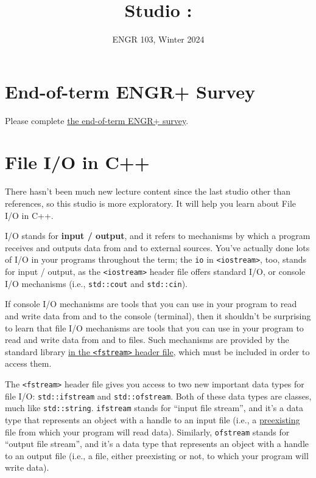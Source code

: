 \documentclass{article}
\title{
    Studio \studionumber: \studiotitle
}
\author{ENGR 103, Winter 2024}
\date{}
\begin{document}
\maketitle

\section{End-of-term ENGR+ Survey}

Please complete \href{https://oregonstate.qualtrics.com/jfe/form/SV_8v8s4iCbF3sr0Fw}{the end-of-term ENGR+ survey}.

\section{File I/O in C++}

There hasn't been much new lecture content since the last studio other than references, so this studio is more exploratory. It will help you learn about File I/O in C++.

I/O stands for \textbf{input / output}, and it refers to mechanisms by which a program receives and outputs data from and to external sources. You've actually done lots of I/O in your programs throughout the term; the \texttt{io} in \texttt{<iostream>}, too, stands for input / output, as the \texttt{<iostream>} header file offers standard I/O, or console I/O mechanisms (i.e., \texttt{std::cout} and \texttt{std::cin}).

If console I/O mechanisms are tools that you can use in your program to read and write data from and to the console (terminal), then it shouldn't be surprising to learn that file I/O mechanisms are tools that you can use in your program to read and write data from and to files. Such mechanisms are provided by the standard library \ul{in the \texttt{<fstream>} header file}, which must be included in order to access them.

The \texttt{<fstream>} header file gives you access to two new important data types for file I/O: \texttt{std::ifstream} and \texttt{std::ofstream}. Both of these data types are classes, much like \texttt{std::string}. \texttt{ifstream} stands for ``input file stream'', and it's a data type that represents an object with a handle to an input file (i.e., a \ul{preexisting} file from which your program will read data). Similarly, \texttt{ofstream} stands for ``output file stream'', and it's a data type that represents an object with a handle to an output file (i.e., a file, either preexisting or not, to which your program will write data).
\end{document}
